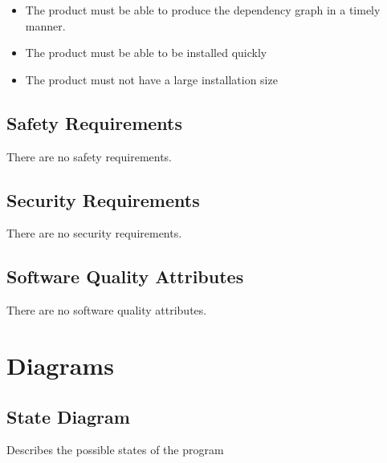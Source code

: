 \documentclass[11pt]{article}
\begin{document}
\begin{itemize}
\item The product must be able to produce the dependency graph in a timely manner.
\item The product must be able to be installed quickly
\item The product must not have a large installation size
\end{itemize}

\subsection{Safety Requirements}

There are no safety requirements.

\subsection{Security Requirements}

There are no security requirements.

\subsection{Software Quality Attributes}

There are no software quality attributes.

\newpage
\section{Diagrams}

\subsection{State Diagram}
Describes the possible states of the program
\end{document}
